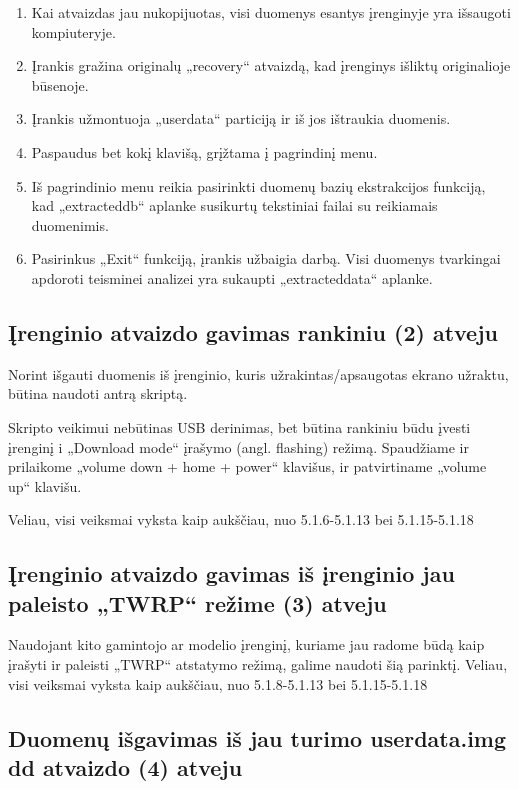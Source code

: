 \documentclass[a4paper,12pt,fleqn]{article}
\begin{document}
\begin{enumerate}
    \item Kai atvaizdas jau nukopijuotas, visi duomenys esantys įrenginyje yra išsaugoti kompiuteryje.  
    \item Įrankis gražina originalų „recovery“ atvaizdą, kad įrenginys išliktų originalioje būsenoje.
    \item Įrankis užmontuoja „userdata“ particiją ir iš jos ištraukia duomenis. 
    \item Paspaudus bet kokį klavišą, grįžtama į pagrindinį menu.
    \item Iš pagrindinio menu reikia pasirinkti duomenų bazių ekstrakcijos funkciją, kad „extracted\textunderscore db“ aplanke susikurtų tekstiniai failai su reikiamais duomenimis.
    \item Pasirinkus „Exit“ funkciją, įrankis užbaigia darbą. Visi duomenys tvarkingai apdoroti teisminei analizei yra sukaupti „extracted\textunderscore data“ aplanke.
\end{enumerate}


\subsection{Įrenginio atvaizdo gavimas rankiniu (2) atveju}

Norint išgauti duomenis iš įrenginio, kuris užrakintas/apsaugotas ekrano užraktu, būtina naudoti antrą skriptą. 

Skripto veikimui nebūtinas USB derinimas, bet būtina rankiniu būdu įvesti įrenginį i „Download mode“ įrašymo (angl. flashing) režimą. Spaudžiame ir prilaikome „volume down + home + power“ klavišus, ir patvirtiname „volume up“ klavišu.

Veliau, visi veiksmai vyksta kaip aukščiau, nuo 5.1.6-5.1.13 bei 5.1.15-5.1.18

\subsection{Įrenginio atvaizdo gavimas iš įrenginio jau paleisto „TWRP“ režime (3) atveju}

Naudojant kito gamintojo ar modelio įrenginį, kuriame jau radome būdą kaip įrašyti ir paleisti „TWRP“ atstatymo režimą, galime naudoti šią parinktį. Veliau, visi veiksmai vyksta kaip aukščiau, nuo 5.1.8-5.1.13 bei 5.1.15-5.1.18

\subsection{Duomenų išgavimas iš jau turimo userdata.img dd atvaizdo (4) atveju}
\end{document}
